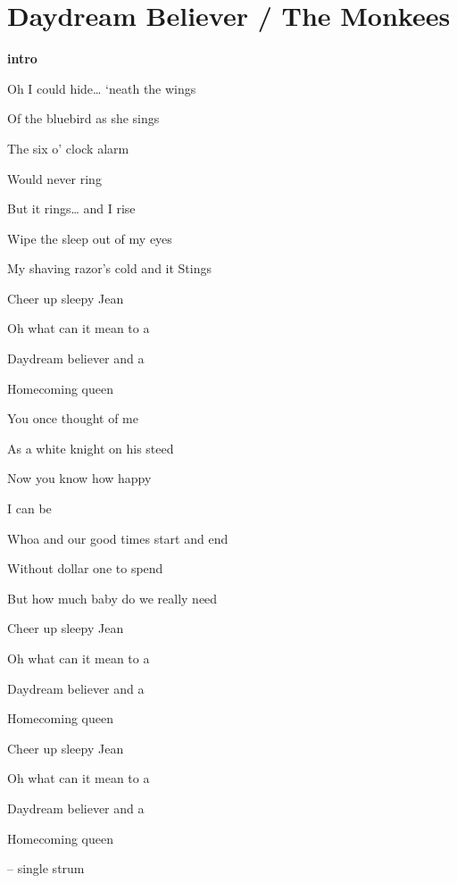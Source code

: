 \section{Daydream Believer / The Monkees}\label{sec:daydreambeliever}

\Gmajor
\Aminor
\Bminor
\EminorSeven
\ASeven
\DSeven
\DmajorEasy
\Eminor


\textbf{intro} 

Oh I could hide… ‘neath the wings

Of the bluebird as she sings

The six o’ clock alarm

Would never ring 

But it rings… and I rise

Wipe the sleep out of my eyes

My shaving razor’s cold and it
Stings

Cheer up sleepy Jean

Oh what can it mean to a

 Daydream believer and a

 Homecoming queen

You once thought of me

As a white knight on his steed

Now you know how happy

I can be 

Whoa and our good times start and end

Without dollar one to spend

But how much baby do we really need

Cheer up sleepy Jean

Oh what can it mean to a

 Daydream believer and a

 Homecoming queen 

Cheer up sleepy Jean

Oh what can it mean to a

 Daydream believer and a

 Homecoming queen 

 – single strum
